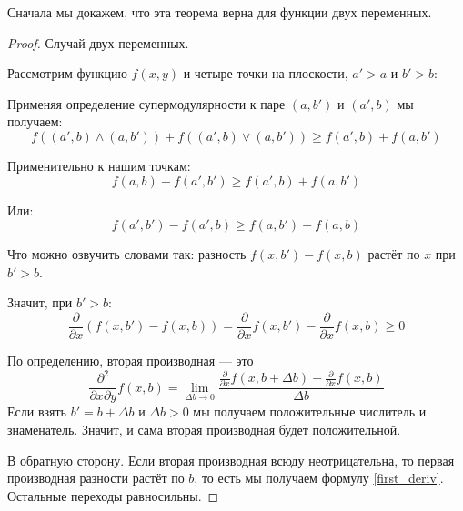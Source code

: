 Сначала мы докажем, что эта теорема верна для функции двух переменных.
\begin{proof} Случай двух переменных.

Рассмотрим функцию $ f(x,y) $ и четыре точки на плоскости, $ a'>a $ и $ b'>b $:



Применяя определение супермодулярности к паре $ (a,b') $ и $ (a',b) $ мы получаем:
\begin{equation}
f((a',b)\wedge(a,b')) + f((a',b)\vee(a,b'))\geq f(a',b) + f(a,b')
\end{equation}

Применительно к нашим точкам:
\begin{equation}
f(a,b)+f(a',b')\geq f(a',b)+f(a,b')
\end{equation}

Или:
\begin{equation}
f(a',b')-f(a',b)\geq f(a,b')-f(a,b)
\end{equation}

Что можно озвучить словами так: разность $ f(x,b')-f(x,b) $ растёт по $ x $ при $ b'>b $.


Значит, при $ b'>b $:
\begin{equation}\label{first_deriv}
\frac{\partial }{\partial x}(f(x,b')-f(x,b))=\frac{\partial }{\partial x}f(x,b')-\frac{\partial }{\partial x} f(x,b) \geq 0
\end{equation}

По определению, вторая производная — это
\begin{equation}
\frac{\partial^{2}}{\partial x \partial y}f(x,b)=\lim_{\Delta b\to 0}\frac{\frac{\partial }{\partial x}f(x,b+\Delta b)-\frac{\partial }{\partial x} f(x,b)}{\Delta b}
\end{equation}
Если взять $ b'=b+\Delta b $ и $ \Delta b>0 $ мы получаем положительные числитель и знаменатель. Значит, и сама вторая производная будет положительной.

В обратную сторону. Если вторая производная всюду неотрицательна, то первая производная разности растёт по $ b $, то есть мы получаем формулу \ref{first_deriv}. Остальные переходы равносильны.

\end{proof}


